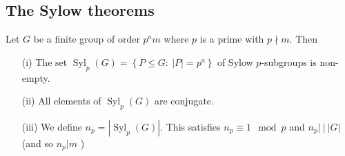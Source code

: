 \documentclass[a4paper]{scrartcl}
\begin{document}
\subsection{The Sylow theorems}
\begin{theorem}\label{sylow}
      Let $G$ be a finite group of order $p^{a}m$ where $p$ is a prime with $p \nmid m$. Then 
      \begin{itemize}
           \item[(i)] The set $\operatorname{Syl}_{p}(G)=\left\{P \leq G: \ |P|=p^{a}\right\}$ of Sylow $p$-subgroups is non-empty.
           \item[(ii)] All elements of $\operatorname{Syl}_{p}(G)$ are conjugate.
           \item[(iii)] We define $n_{p} =|\operatorname{Syl}_{p}(G)|$. This satisfies $n_{p} \equiv 1 \mod p$ and $n_{p}| \ |\ |G|$ (and so $n_{p}|m$ )
      \end{itemize}
\end{theorem}
\end{document}
